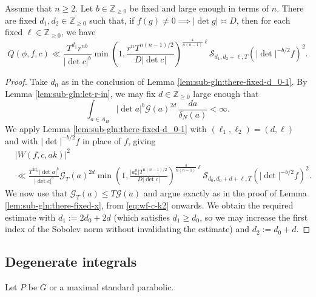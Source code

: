 \begin{lemma}\label{lem:standard:there-fixed-d_1}
  Assume that $n \geq 2$.  Let $b \in \mathbb{Z}_{\geq 0}$ be fixed and large enough in terms of $n$.  There are fixed $d_1,d_2 \in \mathbb{Z}_{\geq 0}$ such that, if $f(g) \neq 0 \implies |\det g| \asymp D$, then for each fixed $\ell \in \mathbb{Z}_{\geq 0}$, we have
  \begin{equation*}
    Q(\phi,f,c) \ll
    \frac{T^{d_1} r^{n b}}{|\det c|^b}
    \min \left( 1,
      \frac{r^n T^{n(n-1)/2}}{D |\det c|}
    \right)^{\frac{4}{n(n-1)} \ell }
    \mathcal{S}_{d_1, d_2 + \ell, T}(|\det|^{-b/2} f)^2.
  \end{equation*}
\end{lemma}
\begin{proof}
  Take $d_0$ as in the conclusion of Lemma \ref{lem:sub-gln:there-fixed-d_0-1}.  By Lemma \ref{lem:sub-gln:let-r-in}, we may fix $d \in \mathbb{Z}_{\geq 0}$ large enough that
  \begin{equation*}
    \int_{a \in A_H} |\det a|^b \mathcal{G}(a)^{2 d} \, \frac{d a}{ \delta_N(a)} < \infty.
  \end{equation*}
  We apply Lemma \ref{lem:sub-gln:there-fixed-d_0-1} with $(\ell_1, \ell_2) = (d,\ell)$ and with $|\det|^{-b/2} f$ in place of $f$, giving
  \begin{align*}
    &|W(f,c,a k)|^2 \\
    &\ll
      \frac{ T^{2 d_0} |\det a|^b}{|\det c|^b}
      \mathcal{G}_T(a)^{2 d}
      \min \left( 1,
      \frac{|a_n^n| T^{n(n-1)/2}}{D |\det c|}
      \right)^{\frac{4}{n(n-1)} \ell }
      \mathcal{S}_{d_0, d_0 + d + \ell, T}(|\det |^{-b/2} f)^2.
  \end{align*}
  We now use that $\mathcal{G}_T(a) \leq T \mathcal{G}(a)$ and argue exactly as in the proof of Lemma \ref{lem:sub-gln:there-fixed-x}, from \eqref{eq:wf-c-k2} onwards.  We obtain the required estimate with $d_1 := 2 d_0 + 2 d$ (which satisfies $d_1 \geq d_0$, so we may increase the first index of the Sobolev norm without invalidating the estimate) and $d_2 := d_0 + d$.
\end{proof}

\subsection{Degenerate integrals}\label{sec:degenerate-integrals}
Let $P$ be $G$ or a maximal standard parabolic.


